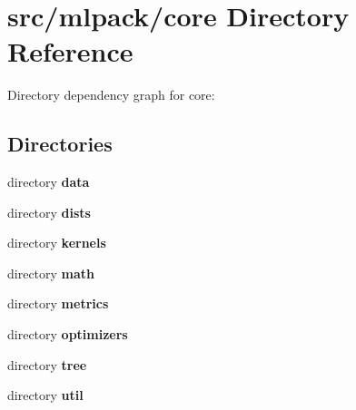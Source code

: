 \section{src/mlpack/core Directory Reference}
\label{dir_4fe3ec57c84c6ad35450b5bbf87898f0}
Directory dependency graph for core\-:
\subsection*{Directories}
\begin{DoxyCompactItemize}
\item 
directory {\bf data}
\item 
directory {\bf dists}
\item 
directory {\bf kernels}
\item 
directory {\bf math}
\item 
directory {\bf metrics}
\item 
directory {\bf optimizers}
\item 
directory {\bf tree}
\item 
directory {\bf util}
\end{DoxyCompactItemize}
